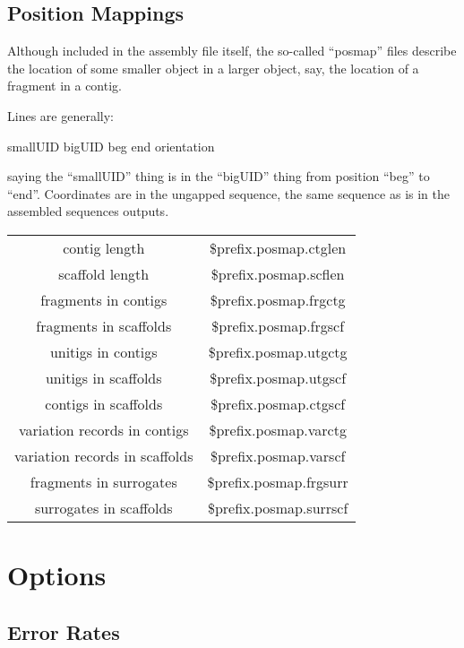 \documentclass[twoside,11pt]{article}
\begin{document}
\subsection{Position Mappings}

Although included in the assembly file itself, the so-called
``posmap'' files describe the location of some smaller object in a
larger object, say, the location of a fragment in a contig.

Lines are generally:

smallUID bigUID beg end orientation

saying the ``smallUID'' thing is in the ``bigUID'' thing from position
``beg'' to ``end''.  Coordinates are in the ungapped sequence, the
same sequence as is in the assembled sequences outputs.

\begin{center}
\begin{tabular}{|c|c|}
\hline
\hline
contig length   & \$prefix.posmap.ctglen \\
scaffold length & \$prefix.posmap.scflen \\
\hline
fragments in contigs   & \$prefix.posmap.frgctg \\
fragments in scaffolds & \$prefix.posmap.frgscf \\
\hline
unitigs in contigs     & \$prefix.posmap.utgctg \\
unitigs in scaffolds   & \$prefix.posmap.utgscf \\
\hline
contigs in scaffolds   & \$prefix.posmap.ctgscf \\
\hline
variation records in contigs   & \$prefix.posmap.varctg \\
variation records in scaffolds & \$prefix.posmap.varscf \\
\hline
fragments in surrogates  & \$prefix.posmap.frgsurr \\
surrogates in scaffolds  & \$prefix.posmap.surrscf \\
\hline
\end{tabular}
\end{center}


\section{Options}

\subsection{Error Rates}
\label{sec:erates}
\end{document}
